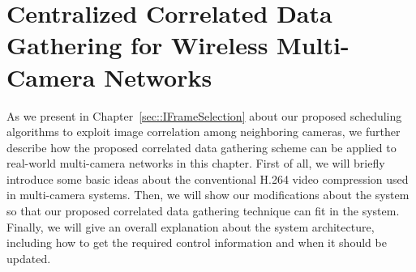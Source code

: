 \section{Centralized Correlated Data Gathering for Wireless Multi-Camera Networks}
\label{sec::protocolDesign}
As we present in Chapter~\ref{sec::IFrameSelection} about our proposed scheduling algorithms to exploit image correlation among neighboring cameras, we further describe how the proposed correlated data gathering scheme can be applied to real-world multi-camera networks in this chapter.
First of all, we will briefly introduce some basic ideas about the conventional H.264 video compression used in multi-camera systems.
Then, we will show our modifications about the system so that our proposed correlated data gathering technique can fit in the system.
Finally, we will give an overall explanation about the system architecture, including how to get the required control information and when it should be updated.
%
%
